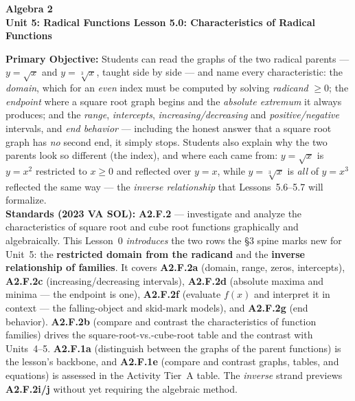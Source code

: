 \documentclass[10pt]{article}
\newcommand{\CourseName}{Algebra 2}
\newcommand{\UnitNumberName}{Unit 5: Radical Functions \quad}
\newcommand{\LessonNumberName}{Lesson 5.0: Characteristics of Radical Functions}
\begin{document}
\begin{center}
    {\Large\bfseries \CourseName \\
    {\small\bfseries \UnitNumberName \LessonNumberName}}
\end{center}

\begin{tcolorbox}[colback=forestbg, colframe=forest, boxrule=0.9pt, arc=2mm,
    left=2mm, right=2mm, top=1.5mm, bottom=1.5mm]
    \textbf{Primary Objective:} Students can read the graphs of the two radical parents ---
    $y=\sqrt{x}$ and $y=\sqrt[3]{x}$, taught side by side --- and name every characteristic: the
    \emph{domain}, which for an \emph{even} index must be computed by solving \emph{radicand}
    $\ge 0$; the \emph{endpoint} where a square root graph begins and the \emph{absolute extremum}
    it always produces; and the \emph{range}, \emph{intercepts}, \emph{increasing/decreasing} and
    \emph{positive/negative} intervals, and \emph{end behavior} --- including the honest answer that
    a square root graph has \emph{no} second end, it simply stops. Students also explain why the two
    parents look so different (the index), and where each came from: $y=\sqrt{x}$ is $y=x^2$
    restricted to $x\ge0$ and reflected over $y=x$, while $y=\sqrt[3]{x}$ is \emph{all} of $y=x^3$
    reflected the same way --- the \emph{inverse relationship} that Lessons~5.6--5.7 will formalize.
    \\[2pt]
    \textbf{Standards (2023 VA SOL):} \textbf{A2.F.2} --- investigate and analyze the characteristics
    of square root and cube root functions graphically and algebraically. This Lesson~0
    \emph{introduces} the two rows the \S3 spine marks new for Unit~5: the \textbf{restricted domain
    from the radicand} and the \textbf{inverse relationship of families}. It covers
    \textbf{A2.F.2a} (domain, range, zeros, intercepts), \textbf{A2.F.2c} (increasing/decreasing
    intervals), \textbf{A2.F.2d} (absolute maxima and minima --- the endpoint is one), \textbf{A2.F.2f}
    (evaluate $f(x)$ and interpret it in context --- the falling-object and skid-mark models), and
    \textbf{A2.F.2g} (end behavior). \textbf{A2.F.2b} (compare and contrast the characteristics of
    function families) drives the square-root-vs.-cube-root table and the contrast with Units~4--5.
    \textbf{A2.F.1a} (distinguish between the graphs of the parent functions) is the lesson's
    backbone, and \textbf{A2.F.1e} (compare and contrast graphs, tables, and equations) is assessed in
    the Activity Tier~A table. The \emph{inverse} strand previews \textbf{A2.F.2i/j} without yet
    requiring the algebraic method.
\end{tcolorbox}
\end{document}
